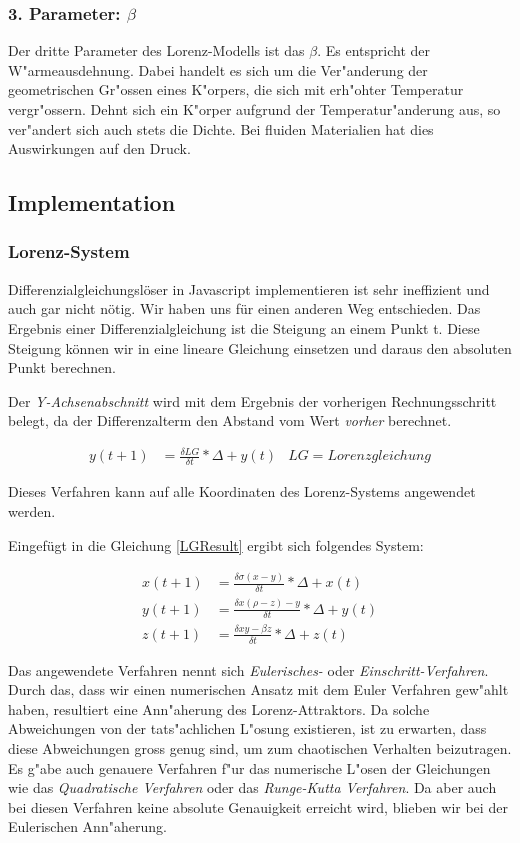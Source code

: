 \subsubsection{3. Parameter: $\beta$}
Der dritte Parameter des Lorenz-Modells ist das $\beta$. Es entspricht der W"armeausdehnung. Dabei handelt es sich um die Ver"anderung der geometrischen Gr"ossen eines K"orpers, die sich mit erh"ohter Temperatur vergr"ossern. Dehnt sich ein K"orper aufgrund der Temperatur"anderung aus, so ver"andert sich auch stets die Dichte. Bei fluiden Materialien hat dies Auswirkungen auf den Druck. 

\subsection{Implementation}

\subsubsection{Lorenz-System}
Differenzialgleichungslöser in Javascript implementieren ist sehr ineffizient und auch gar nicht nötig. Wir haben uns für einen anderen Weg entschieden. Das Ergebnis einer Differenzialgleichung ist die Steigung an einem Punkt t. Diese Steigung können wir in eine lineare Gleichung einsetzen und daraus den absoluten Punkt berechnen.

Der \textit{Y-Achsenabschnitt} wird mit dem Ergebnis der vorherigen Rechnungsschritt belegt, da der Differenzalterm den Abstand vom Wert \textit{vorher} berechnet.  

\begin{align}
\label{LGResult}
y(t + 1) &= \frac{\delta LG}{\delta t} * \Delta + y(t) & LG = Lorenzgleichung
\end{align}

Dieses Verfahren kann auf alle Koordinaten des Lorenz-Systems angewendet werden.

Eingefügt in die Gleichung \eqref{LGResult} ergibt sich folgendes System:

\begin{centerFigure}
\begin{align}
x(t + 1) &= \frac{\delta \sigma(x - y)}{\delta t} * \Delta + x(t)\\
y(t + 1) &= \frac{\delta x(\rho - z) - y}{\delta t} * \Delta + y(t)\\
z(t + 1) &= \frac{\delta xy - \beta z}{\delta t} * \Delta + z(t)
\end{align}
\end{centerFigure}
Das angewendete Verfahren nennt sich \textit{Eulerisches-} oder \textit{Einschritt-Verfahren}. Durch das, dass wir einen numerischen Ansatz mit dem Euler Verfahren gew"ahlt haben, resultiert eine Ann"aherung des Lorenz-Attraktors. Da solche Abweichungen von der tats"achlichen L"osung existieren, ist zu erwarten, dass diese Abweichungen gross genug sind, um zum chaotischen Verhalten beizutragen. Es g"abe auch genauere Verfahren f"ur das numerische L"osen der Gleichungen wie das \textit{Quadratische Verfahren} oder das \textit{Runge-Kutta Verfahren}. Da aber auch bei diesen Verfahren keine absolute Genauigkeit erreicht wird, blieben wir bei der Eulerischen Ann"aherung. 


